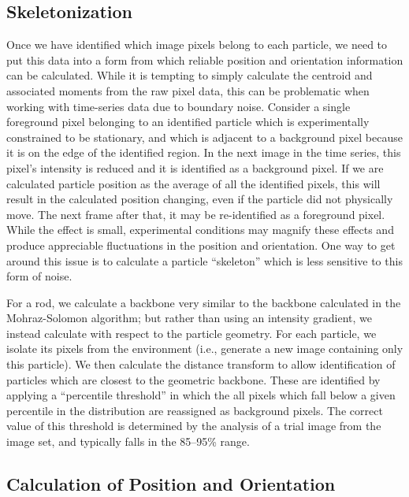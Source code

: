 \subsection{Skeletonization}

Once we have identified which image pixels belong to each particle, we need to put this data into a form from
which reliable position and orientation information can be calculated.  While it is tempting to simply
calculate the centroid and associated moments from the raw pixel data, this can be problematic when working with
time-series data due to boundary noise. Consider a single foreground pixel belonging to 
an identified particle which is experimentally
constrained to be stationary, and which is adjacent to a background pixel because it is on the edge of the identified 
region. In the next image in the time series, this pixel's intensity is reduced and it is identified as a background
pixel.  If we are calculated particle position as the average of all the identified pixels, this will result in 
the calculated position changing, even if the particle did not physically move. The next frame after that, it 
may be re-identified as a foreground pixel.  While the effect is small, experimental conditions may magnify
these effects and produce appreciable fluctuations in the position and orientation. One way to get around this issue
is to calculate a particle ``skeleton'' which is less sensitive to this form of noise.~\cite{soille-book}

For a rod, we calculate a backbone very similar to the backbone calculated in the Mohraz-Solomon algorithm; but rather 
than using an intensity gradient, we instead calculate with respect to the particle geometry. For each particle, we 
isolate its pixels from the environment (i.e., generate a new image containing only this particle). We then
calculate the distance transform to allow identification of particles which are closest to the 
geometric backbone.  These are identified by applying a ``percentile threshold'' in which the all pixels which
fall below a given percentile in the distribution are reassigned as background pixels. 
The correct value of this threshold is determined by the analysis of a trial image from the image set,
and typically falls in the 85--95\% range.

\subsection{Calculation of Position and Orientation}

